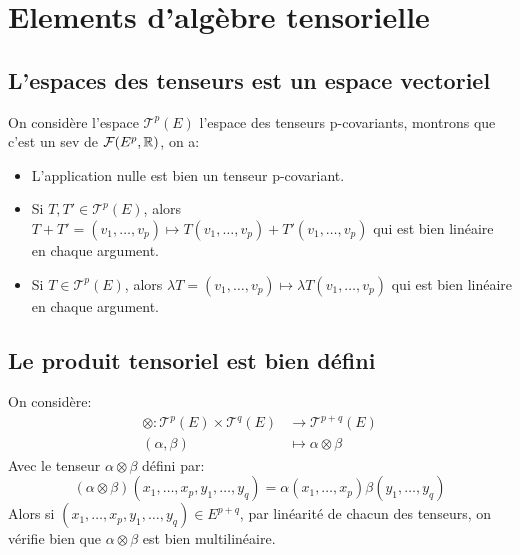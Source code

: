 \chapter{Elements d'algèbre tensorielle}

\section{L'espaces des tenseurs est un espace vectoriel}
On considère l'espace \( \mathscr{T}^p(E) \) l'espace des tenseurs p-covariants, montrons que c'est un sev de \( \mathcal{F}(E^p, \mathbb{R}) \), on a:
\begin{itemize}
   \item L'application nulle est bien un tenseur p-covariant.
   \item Si \( T, T' \in \mathscr{T}^p(E)\), alors \( T + T' = (v_1, \ldots, v_p) \mapsto T(v_1, \ldots, v_p) + T'(v_1, \ldots, v_p) \) qui est bien linéaire en chaque argument.
   \item Si \( T \in \mathscr{T}^p(E)\), alors \( \lambda T = (v_1, \ldots, v_p) \mapsto \lambda T(v_1, \ldots, v_p) \) qui est bien linéaire en chaque argument.
\end{itemize}
\section{Le produit tensoriel est bien défini}
On considère: 
\begin{align*}
   \otimes : \mathscr{T}^p(E) \times \mathscr{T}^q(E) &\longrightarrow \mathscr{T}^{p+q}(E)\\
   (\alpha, \beta) &\longmapsto \alpha \otimes \beta
\end{align*}
Avec le tenseur \(\alpha \otimes \beta\) défini par:
\[
   (\alpha \otimes \beta)(x_1, \ldots, x_p, y_1, \ldots, y_q) = \alpha(x_1, \ldots, x_p)\beta(y_1, \ldots, y_q)
\]
Alors si \( (x_1, \ldots, x_p, y_1, \ldots, y_q) \in E^{p+q} \), par linéarité de chacun des tenseurs, on vérifie bien que \( \alpha \otimes \beta \) est bien multilinéaire.
